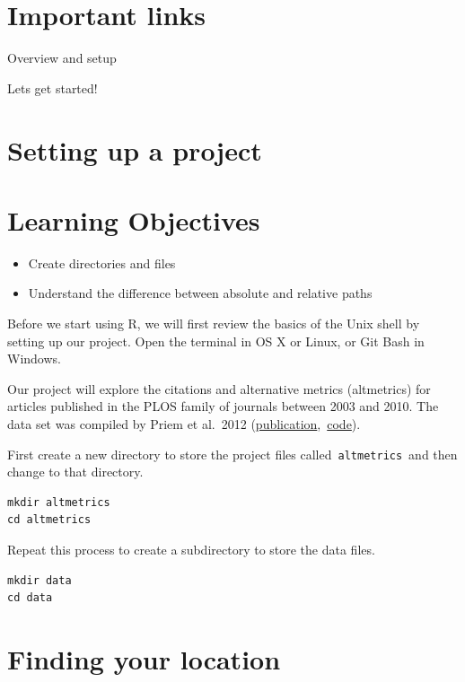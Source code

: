 \documentclass[
]{book}
\providecommand{\tightlist}{%
  \setlength{\itemsep}{0pt}\setlength{\parskip}{0pt}}
\begin{document}
\hypertarget{important-links}{%
\section{Important links}\label{important-links}}

Overview and setup

Lets get started!

\hypertarget{setting-up-a-project}{%
\section{Setting up a project}\label{setting-up-a-project}}

\hypertarget{learning-objectives}{%
\section{Learning Objectives}\label{learning-objectives}}

\begin{itemize}
\tightlist
\item
  Create directories and files
\item
  Understand the difference between absolute and relative paths
\end{itemize}

Before we start using R, we will first review the basics of the Unix shell by setting up our project. Open the terminal in OS X or Linux, or Git Bash in Windows.

Our project will explore the citations and alternative metrics (altmetrics) for articles published in the PLOS family of journals between 2003 and 2010. The data set was compiled by Priem et al.~2012 (\href{http://arxiv.org/abs/1203.4745}{publication},~\href{https://github.com/jasonpriem/plos_altmetrics_study}{code}).

First create a new directory to store the project files called~\texttt{altmetrics}~and then change to that directory.

\begin{verbatim}
mkdir altmetrics
cd altmetrics
\end{verbatim}

Repeat this process to create a subdirectory to store the data files.

\begin{verbatim}
mkdir data
cd data
\end{verbatim}

\hypertarget{finding-your-location}{%
\section{Finding your location}\label{finding-your-location}}
\end{document}
